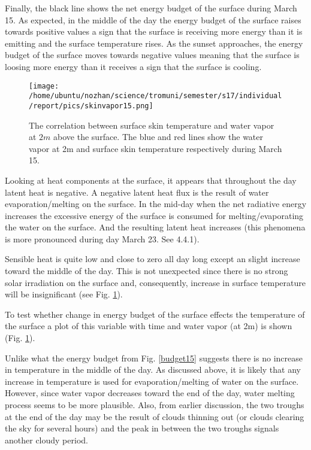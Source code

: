 \documentclass[a4paper,12pt]{article}
\numberwithin{equation}{section} %
\begin{document}
Finally, the black line shows the net energy budget of the surface during March 15. As expected, in the middle of the day the energy budget of the surface raises towards positive values a sign that the surface is receiving more energy than it is emitting and the surface temperature rises. As the sunset approaches, the energy budget of the surface moves towards negative values meaning that the surface is loosing more energy than it receives a sign that the surface is cooling.

\begin{figure}[bhp]
\texttt{[image: /home/ubuntu/nozhan/science/tromuni/semester/s17/individual/report/pics/skinvapor15.png]}
\caption{The correlation between surface skin temperature and water vapor at $2m$ above the surface. The blue and red lines show the water vapor at 2m and surface skin temperature respectively during March 15.}
\label{skinvapor15}
\end{figure}

Looking at heat components at the surface, it appears that throughout the day latent heat is negative. A negative latent heat flux is the result of water evaporation/melting on the surface. In the mid-day when the net radiative energy increases the excessive energy of the surface is consumed for melting/evaporating the water on the surface. And the resulting latent heat increases (this phenomena is more pronounced during day March 23. See 4.4.1).

Sensible heat is quite low and close to zero all day long except an slight increase toward the middle of the day. This is not unexpected since there is no strong solar irradiation on the surface and, consequently, increase in surface temperature will be insignificant (see Fig. \ref{skinvapor15}).

To test whether change in energy budget of the surface effects the temperature of the surface a plot of this variable with time and water vapor (at 2m) is shown (Fig. \ref{skinvapor15}). 

Unlike what the energy budget from Fig. \ref{budget15} suggests there is no increase in temperature in the middle of the day. As discussed above, it is likely that any increase in temperature is used for evaporation/melting of water on the surface. However, since water vapor decreases toward the end of the day, water melting process seems to be more plausible. Also, from earlier discussion, the two troughs at the end of the day may be the result of clouds thinning out (or clouds clearing the sky for several hours) and the peak in between the two troughs signals another cloudy period.
\end{document}
